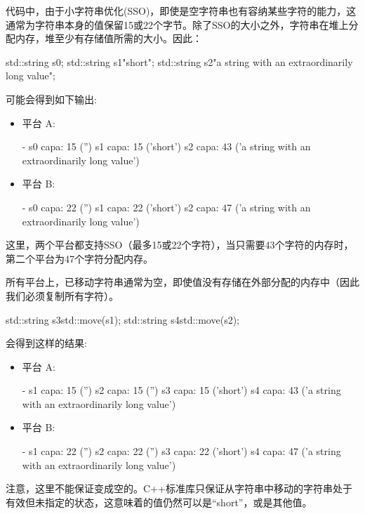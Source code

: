 代码中，由于小字符串优化(SSO)，即使是空字符串也有容纳某些字符的能力，这通常为字符串本身的值保留15或22个字节。除了SSO的大小之外，字符串在堆上分配内存，堆至少有存储值所需的大小。因此：

\begin{cppcode}
std::string s0;
std::string s1{"short"};
std::string s2{"a string with an extraordinarily long value"};
\end{cppcode}

可能会得到如下输出:

\begin{itemize}
	\item 平台 A:
	\begin{outputcode}
- s0 capa: 15 ('')
s1 capa: 15 ('short')
s2 capa: 43 ('a string with an extraordinarily long value')
	\end{outputcode}
	\item 平台 B:
	\begin{outputcode}
- s0 capa: 22 ('')
s1 capa: 22 ('short')
s2 capa: 47 ('a string with an extraordinarily long value')
	\end{outputcode}
\end{itemize}

这里，两个平台都支持SSO（最多15或22个字符），当只需要43个字符的内存时，第二个平台为47个字符分配内存。

所有平台上，已移动字符串通常为空，即使值没有存储在外部分配的内存中（因此我们必须复制所有字符）。

\begin{cppcode}
std::string s3{std::move(s1)};
std::string s4{std::move(s2)};
\end{cppcode}

会得到这样的结果:

\begin{itemize}
	\item 平台 A:
	\begin{outputcode}
- s1 capa: 15 ('')
s2 capa: 15 ('')
s3 capa: 15 ('short')
s4 capa: 43 ('a string with an extraordinarily long value')
	\end{outputcode}
	\item 平台 B:
	\begin{outputcode}
- s1 capa: 22 ('')
s2 capa: 22 ('')
s3 capa: 22 ('short')
s4 capa: 47 ('a string with an extraordinarily long value')
	\end{outputcode}
\end{itemize}

注意，这里不能保证变成空的。C++标准库只保证从字符串中移动的字符串处于有效但未指定的状态，这意味着的值仍然可以是“short”，或是其他值。

